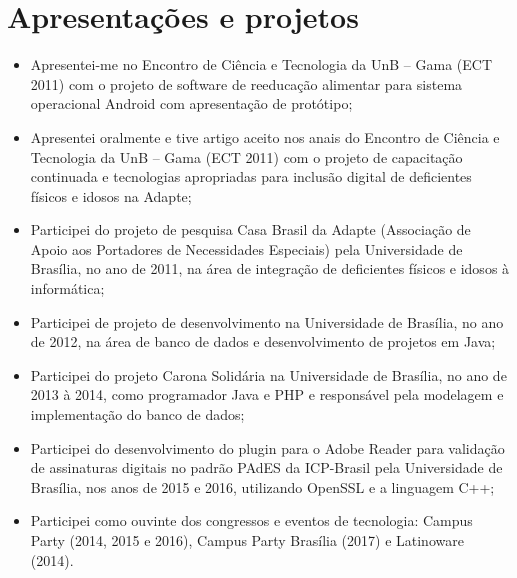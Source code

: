 \section{Apresentações e projetos}

\begin{itemize}
    \item Apresentei-me no Encontro de Ciência e Tecnologia da UnB – Gama (ECT 2011) com o projeto de software de reeducação alimentar para sistema operacional Android com apresentação de protótipo;
    \item Apresentei oralmente e tive artigo aceito nos anais do Encontro de Ciência e Tecnologia da UnB – Gama (ECT 2011) com o projeto de capacitação continuada e tecnologias apropriadas para inclusão digital de deficientes físicos e idosos na Adapte;
    \item Participei do projeto de pesquisa Casa Brasil da Adapte (Associação de Apoio aos Portadores de Necessidades Especiais) pela Universidade de Brasília, no ano de 2011, na área de integração de deficientes físicos e idosos à informática;
    \item Participei de projeto de desenvolvimento na Universidade de Brasília, no ano de 2012, na área de banco de dados e desenvolvimento de projetos em Java;
    \item Participei do projeto Carona Solidária na Universidade de Brasília, no ano de 2013 à 2014, como programador Java e PHP e responsável pela modelagem e implementação do banco de dados;
    \item Participei do desenvolvimento do plugin para o Adobe Reader para validação de assinaturas digitais no padrão PAdES da ICP-Brasil pela Universidade de Brasília, nos anos de 2015 e 2016, utilizando OpenSSL e a linguagem C++;
    \item Participei como ouvinte dos congressos e eventos de tecnologia: Campus Party (2014, 2015 e 2016), Campus Party Brasília (2017) e Latinoware (2014).
\end{itemize}